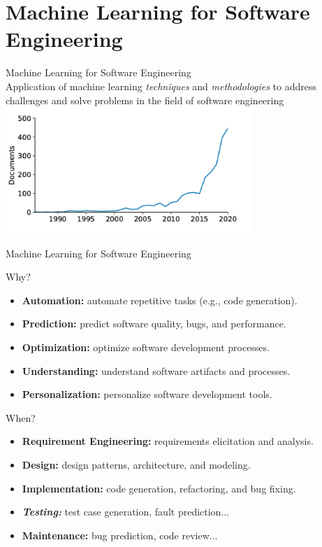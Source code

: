 \documentclass[presentation, 10pt]{beamer}\mode<presentation>{\usetheme{AMSBolognaFC}}
\begin{document}
\section{Machine Learning for Software Engineering}
\begin{frame}[plain]
\centering
\huge{Machine Learning for Software Engineering}
\\[1em]
\large{
Application of machine learning \emph{techniques} and \emph{methodologies} to address challenges and solve problems in the field of software engineering}
\\[1em]
\includegraphics[width=0.7\textwidth]{img/pubblication-over-year.png}
\end{frame}
\begin{frame}{Machine Learning for Software Engineering}
\begin{exampleblock}{Why?}
	\begin{itemize}
	\item \textbf{Automation:} automate repetitive tasks (e.g., code generation).
	\item \textbf{Prediction:} predict software quality, bugs, and performance.
	\item \textbf{Optimization:} optimize software development processes.
	\item \textbf{Understanding:} understand software artifacts and processes.
	\item \textbf{Personalization:} personalize software development tools.
\end{itemize}
\end{exampleblock}
\begin{exampleblock}{When?}
	\begin{itemize}
		\item \textbf{Requirement Engineering:} requirements elicitation and analysis.
		\item \textbf{Design:} design patterns, architecture, and modeling.
		\item \textbf{Implementation:} code generation, refactoring, and bug fixing.
		\item \emph{\textbf{Testing:}} test case generation, fault prediction...
		\item \textbf{Maintenance:} bug prediction, code review...
	\end{itemize}
\end{exampleblock}
\end{frame}
\end{document}
